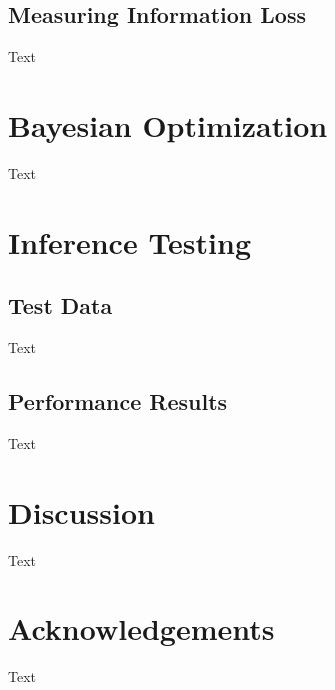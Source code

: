 \documentclass[twocolumn]{aastex631}
\begin{document}
\subsection{Measuring Information Loss}
Text

\section{Bayesian Optimization}
Text

\section{Inference Testing}
\subsection{Test Data}
Text
\subsection{Performance Results}
Text

\section{Discussion}
Text

\section*{Acknowledgements}
Text
\end{document}
